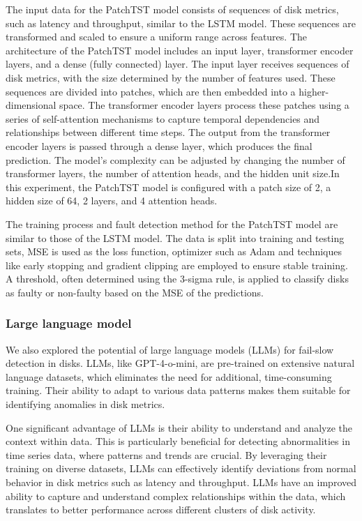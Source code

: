 \documentclass{article}
\begin{document}
\quad The input data for the PatchTST model consists of sequences of disk metrics, such as latency and throughput, similar to the LSTM model. These sequences are transformed and scaled to ensure a uniform range across features.
The architecture of the PatchTST model includes an input layer, transformer encoder layers, and a dense (fully connected) layer. The input layer receives sequences of disk metrics, with the size determined by the number of features used. These sequences are divided into patches, which are then embedded into a higher-dimensional space. The transformer encoder layers process these patches using a series of self-attention mechanisms to capture temporal dependencies and relationships between different time steps. The output from the transformer encoder layers is passed through a dense layer, which produces the final prediction. 
\quad The model's complexity can be adjusted by changing the number of transformer layers, the number of attention heads, and the hidden unit size.In this experiment, the PatchTST model is configured with a patch size of 2, a hidden size of 64, 2 layers, and 4 attention heads.

\quad The training process and fault detection method for the PatchTST model are similar to those of the LSTM model. The data is split into training and testing sets, MSE is used as the loss function, optimizer such as Adam and techniques like early stopping and gradient clipping are employed to ensure stable training. A threshold, often determined using the 3-sigma rule, is applied to classify disks as faulty or non-faulty based on the MSE of the predictions.

\subsubsection{Large language model}

\quad We also explored the potential of large language models (LLMs) for fail-slow detection in disks. LLMs, like GPT-4-o-mini, are pre-trained on extensive natural language datasets, which eliminates the need for additional, time-consuming training. Their ability to adapt to various data patterns makes them suitable for identifying anomalies in disk metrics.

\quad One significant advantage of LLMs is their ability to understand and analyze the context within data. This is particularly beneficial for detecting abnormalities in time series data, where patterns and trends are crucial. By leveraging their training on diverse datasets, LLMs can effectively identify deviations from normal behavior in disk metrics such as latency and throughput. LLMs have an improved ability to capture and understand complex relationships within the data, which translates to better performance across different clusters of disk activity.
\end{document}
